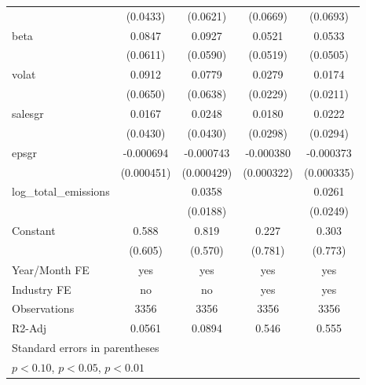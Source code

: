 \begin{table}[htbp]
\begin{tabular}{l*{4}{c}}
                    &    (0.0433)         &    (0.0621)         &    (0.0669)         &    (0.0693)         \\
[1em]
beta                &      0.0847         &      0.0927         &      0.0521         &      0.0533         \\
                    &    (0.0611)         &    (0.0590)         &    (0.0519)         &    (0.0505)         \\
[1em]
volat               &      0.0912         &      0.0779         &      0.0279         &      0.0174         \\
                    &    (0.0650)         &    (0.0638)         &    (0.0229)         &    (0.0211)         \\
[1em]
salesgr             &      0.0167         &      0.0248         &      0.0180         &      0.0222         \\
                    &    (0.0430)         &    (0.0430)         &    (0.0298)         &    (0.0294)         \\
[1em]
epsgr               &   -0.000694         &   -0.000743\sym{*}  &   -0.000380         &   -0.000373         \\
                    &  (0.000451)         &  (0.000429)         &  (0.000322)         &  (0.000335)         \\
[1em]
log\_total\_emissions &                     &      0.0358\sym{*}  &                     &      0.0261         \\
                    &                     &    (0.0188)         &                     &    (0.0249)         \\
[1em]
Constant            &       0.588         &       0.819         &       0.227         &       0.303         \\
                    &     (0.605)         &     (0.570)         &     (0.781)         &     (0.773)         \\
\hline
Year/Month FE       &         yes         &         yes         &         yes         &         yes         \\
Industry FE         &          no         &          no         &         yes         &         yes         \\
Observations        &        3356         &        3356         &        3356         &        3356         \\
R2-Adj              &      0.0561         &      0.0894         &       0.546         &       0.555         \\
\hline\hline
\multicolumn{5}{l}{\footnotesize Standard errors in parentheses}\\
\multicolumn{5}{l}{\footnotesize \sym{*} \(p<0.10\), \sym{**} \(p<0.05\), \sym{***} \(p<0.01\)}\\
\end{tabular}
\end{table}
